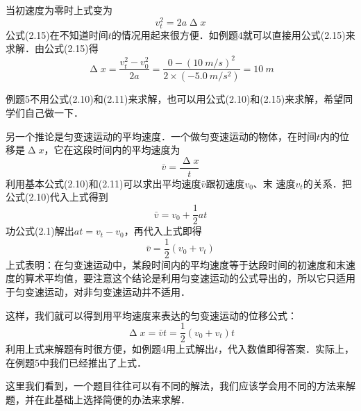 当初速度为零时上式变为
\begin{equation}
    v^2_t=2a\upDelta x
\end{equation}
公式(2.15)在不知道时间$t$的情况用起来很方便．如例题4就可以直接用公式(2.15)来求解．由公式(2.15)得
\[\upDelta x=\frac{v^2_t-v^2_0}{2a}=\frac{0-(\qty{10}{m/s})^2}{2\times (\qty{-5.0}{m/s^2})}=\qty{10}{m}\]

例题5不用公式(2.10)和(2.11)来求解，也可以用公式(2.10)和(2.15)来求解，希望同学们自己做一下．

另一个推论是匀变速运动的平均速度．一个做匀变速运动的物体，在时间$t$内的位移是$\upDelta x$，它在这段时间内的平均速度为
\[\bar v=\frac{\upDelta x}{t} \]
利用基本公式(2.10)和(2.11)可以求出平均速度$\bar v$跟初速度$v_0$、末
速度$v_t$的关系．把公式(2.10)代入上式得到
\[\bar v=v_0+\frac{1}{2}at \]
功公式(2.1)解出$at=v_t-v_0$，再代入上式即得
\begin{equation}
    \bar v=\frac{1}{2}(v_0+v_t)
\end{equation}
上式表明：在匀变速运动中，某段时间内的平均速度等于达段时间的初速度和末速度的算术平均值，要注意这个结论是利用匀变速运动的公式导出的，所以它只适用于匀变速运动，对非匀变速运动并不适用．

这样，我们就可以得到用平均速度来表达的匀变速运动的位移公式：
\[\upDelta x=\bar v t=\frac{1}{2} (v_0+v_t)t\]
利用上式来解题有时很方便，如例题4用上式解出$t$，代入数值即得答案．实际上，在例题5中我们已经推出了上式．

这里我们看到，一个题目往往可以有不同的解法，我们应该学会用不同的方法来解题，并在此基础上选择简便的办法来求解．


